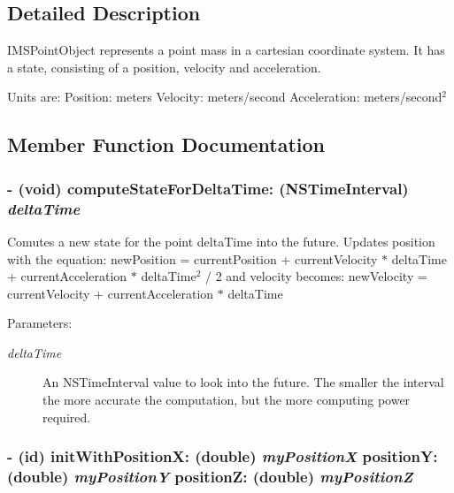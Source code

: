 \subsection{Detailed Description}
IMSPointObject represents a point mass in a cartesian coordinate system. It has a state, consisting of a position, velocity and acceleration.

Units are: Position: meters Velocity: meters/second Acceleration: meters/second$^{\mbox{2}}$  

\subsection{Member Function Documentation}
\hypertarget{interface_i_m_s_r_point_object_5b40a3863dafb9a433c7f29ce347de9d}{
\subsubsection[{computeStateForDeltaTime:}]{\setlength{\rightskip}{0pt plus 5cm}- (void) computeStateForDeltaTime: (NSTimeInterval) {\em deltaTime}}}
\label{interface_i_m_s_r_point_object_5b40a3863dafb9a433c7f29ce347de9d}


Comutes a new state for the point deltaTime into the future. Updates position with the equation: newPosition = currentPosition + currentVelocity $\ast$ deltaTime + currentAcceleration $\ast$ deltaTime$^{\mbox{2}}$  / 2 and velocity becomes: newVelocity = currentVelocity + currentAcceleration $\ast$ deltaTime

\begin{Desc}
\item[Parameters:]
\begin{description}
\item[{\em deltaTime}]An NSTimeInterval value to look into the future. The smaller the interval the more accurate the computation, but the more computing power required. \end{description}
\end{Desc}
\hypertarget{interface_i_m_s_r_point_object_552bfa41162162288ccd39c6a0126e7b}{
\subsubsection[{initWithPositionX:positionY:positionZ:}]{\setlength{\rightskip}{0pt plus 5cm}- (id) initWithPositionX: (double) {\em myPositionX}\/ positionY: (double) {\em myPositionY}\/ positionZ: (double) {\em myPositionZ}}}
\label{interface_i_m_s_r_point_object_552bfa41162162288ccd39c6a0126e7b}


